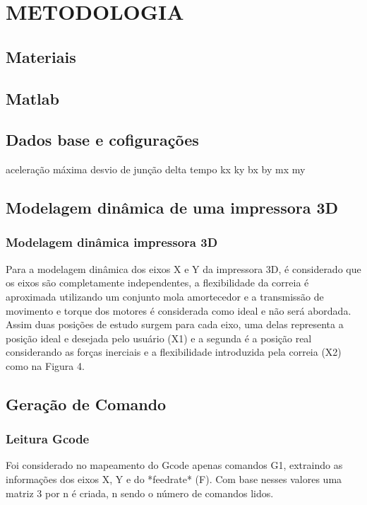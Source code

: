 \chapter{METODOLOGIA}

\section{Materiais}

\section{Matlab}

\section{Dados base e cofigurações}

aceleração máxima
desvio de junção
delta tempo
kx
ky
bx
by
mx
my


\section{Modelagem dinâmica de uma impressora 3D}


\subsection{Modelagem dinâmica impressora 3D}

Para a modelagem dinâmica dos eixos X e Y da impressora 3D, 
é considerado que os eixos são completamente independentes, 
a flexibilidade da correia é aproximada utilizando um conjunto 
mola amortecedor e a transmissão de movimento e torque dos 
motores é considerada como ideal e não será abordada.
Assim duas posições de estudo surgem para cada eixo, uma delas 
representa a posição ideal e desejada pelo usuário (X1) e a 
segunda é a posição real considerando as forças inerciais e a 
flexibilidade introduzida pela correia (X2) como na Figura 4.

\section{Geração de Comando}

\subsection{Leitura Gcode}

Foi considerado no mapeamento do Gcode apenas comandos G1, extraindo
as informações dos eixos X, Y e do *feedrate* (F). Com base nesses valores
uma matriz 3 por n é criada, n sendo o número de comandos lidos.

